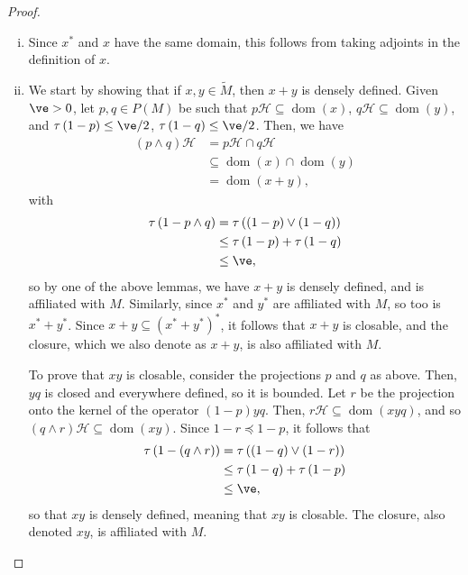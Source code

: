 \documentclass[10pt]{mypackage}
\begin{document}
\begin{proof}
  \begin{enumerate}[(i)]
    \item Since $x^{\ast}$ and $x$ have the same domain, this follows from taking adjoints in the definition of $x$.
    \item We start by showing that if $x,y\in \widetilde{M}$, then $x + y$ is densely defined. Given $\ve > 0$, let $p,q\in P(M)$ be such that $p\mathcal{H}\subseteq \operatorname{dom}\left( x \right)$, $q\mathcal{H}\subseteq \operatorname{dom}\left( y \right)$, and $\tau\left( 1-p \right)\leq \ve/2$, $\tau\left( 1-q \right)\leq \ve/2$. Then, we have
      \begin{align*}
        \left( p\wedge q \right)\mathcal{H} &= p\mathcal{H}\cap q\mathcal{H}\\
                                            &\subseteq \operatorname{dom}\left( x \right)\cap \operatorname{dom}\left( y \right)\\
                                            &= \operatorname{dom}\left( x + y \right),
      \end{align*}
      with
      \begin{align*}
        \tau\left( 1-p\wedge q \right) &= \tau\left( \left( 1-p \right)\vee \left( 1-q \right) \right)\\
                                       &\leq \tau\left( 1-p \right) + \tau\left( 1-q \right)\\
                                       &\leq \ve,
      \end{align*}
      so by one of the above lemmas, we have $x + y$ is densely defined, and is affiliated with $M$. Similarly, since $x^{\ast}$ and $y^{\ast} $ are affiliated with $M$, so too is $x^{\ast} + y^{\ast}$. Since $x+y\subseteq \left( x^{\ast} + y^{\ast} \right)^{\ast}$, it follows that $x + y$ is closable, and the closure, which we also denote as $x + y$, is also affiliated with $M$.

      To prove that $xy$ is closable, consider the projections $p$ and $q$ as above. Then, $yq$ is closed and everywhere defined, so it is bounded. Let $r$ be the projection onto the kernel of the operator $\left( 1-p \right)yq$. Then, $r \mathcal{H}\subseteq \operatorname{dom}\left( xyq \right)$, and so $\left( q\wedge r \right) \mathcal{H}\subseteq \operatorname{dom}\left( xy \right)$. Since $1-r \preceq 1-p$, it follows that
      \begin{align*}
        \tau\left( 1-\left( q\wedge r \right) \right) &= \tau\left( \left( 1-q \right)\vee \left( 1-r \right) \right)\\
                                                      &\leq \tau\left( 1-q \right) + \tau\left( 1-p \right)\\
                                                      &\leq \ve,
      \end{align*}
      so that $xy$ is densely defined, meaning that $xy$ is closable. The closure, also denoted $xy$, is affiliated with $M$.
  \end{enumerate}
\end{proof}
\end{document}
